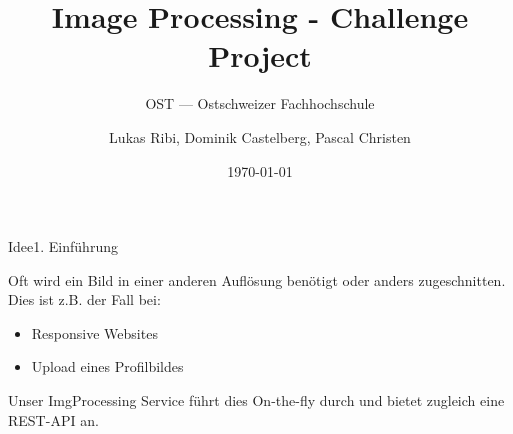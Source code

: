 \documentclass[aspectratio=169,20pt]{beamer}
\title{Image Processing - Challenge Project}
\subtitle{OST — Ostschweizer Fachhochschule}
\date{\today}
\author{Lukas Ribi, Dominik Castelberg, Pascal Christen}
\institute{DS1 - Thomas Bocek }
\begin{document}
\begin{frame}
	\titlepage
\end{frame}

\begin{frame}{Idee}{1. Einführung}
	
	Oft wird ein Bild in einer anderen Auflösung benötigt oder anders zugeschnitten. Dies ist z.B. der Fall bei:
	
	\begin{itemize}
		\item{Responsive Websites}
		\item{Upload eines Profilbildes}
	\end{itemize}
	
	Unser ImgProcessing Service führt dies On-the-fly durch und bietet zugleich eine REST-API an.
	
\end{frame}
\end{document}
